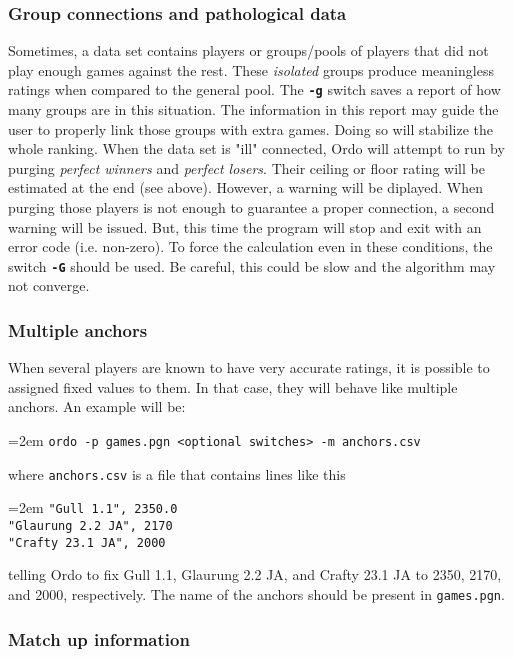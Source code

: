 \documentclass[12pt]{article}
\newcommand{\swtch} [1] {\texttt{\textbf{#1}}}
\newcommand{\filename} [1] {\texttt{#1}}
\newcommand{\cmdln}[1]{
	\par
	\begingroup
		\leftskip=2em
		\addtolength{\rightskip}{0em}
		\noindent \small{\texttt{#1}}
		\par
	\endgroup
}
\begin{document}
\subsubsection*{Group connections and pathological data}

Sometimes, a data set contains players or groups/pools of players that did not play enough games against the rest. 
These \textit{isolated} groups produce meaningless ratings when compared to the general pool. 
The \swtch{-g} switch saves a report of how many groups are in this situation.
The information in this report may guide the user to properly link those groups with extra games.
Doing so will stabilize the whole ranking.
When the data set is "ill" connected, Ordo will attempt to run by purging \textit{perfect winners} and \textit{perfect losers}.
Their ceiling or floor rating will be estimated at the end (see above). 
However, a warning will be diplayed.
When purging those players is not enough to guarantee a proper connection, a second warning will be issued.
But, this time the program will stop and exit with an error code (i.e. non-zero).
To force the calculation even in these conditions, the switch \swtch{-G} should be used.
Be careful, this could be slow and the algorithm may not converge.
 
\subsubsection*{Multiple anchors}

When several players are known to have very accurate ratings, it is possible to assigned fixed values to them.
In that case, they will behave like multiple anchors. An example will be:

\cmdln{ordo -p games.pgn <optional switches> -m anchors.csv}

where \filename{anchors.csv} is a file that contains lines like this

\cmdln{"Gull 1.1", 2350.0\\
"Glaurung 2.2 JA", 2170\\
"Crafty 23.1 JA", 2000}

telling Ordo to fix Gull 1.1, Glaurung 2.2 JA, and Crafty 23.1 JA to 2350, 2170, and 2000, respectively.
The name of the anchors should be present in \filename{games.pgn}.

\subsubsection*{Match up information}
\end{document}
